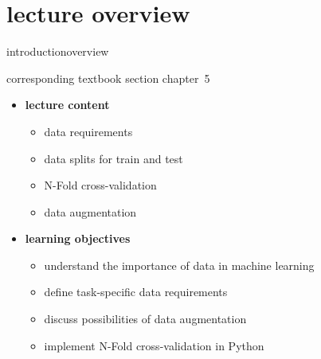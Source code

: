 


\subtitle{Module 5.0: Data, Data Splits, and Augmentation}


	

    \section[overview]{lecture overview}
        \begin{frame}{introduction}{overview}
            \begin{block}{corresponding textbook section}
                    chapter~5
            \end{block}

            \begin{itemize}
                \item   \textbf{lecture content}
                    \begin{itemize}
                        \item   data requirements
                        \item   data splits for train and test
                        \item   N-Fold cross-validation
                        \item   data augmentation
                    \end{itemize}
                \bigskip
                \item<2->   \textbf{learning objectives}
                    \begin{itemize}
                        \item   understand the importance of data in machine learning 
                        \item   define task-specific data requirements
                        \item   discuss possibilities of data augmentation
                        \item   implement N-Fold cross-validation in Python
                    \end{itemize}
            \end{itemize}
        \end{frame}

